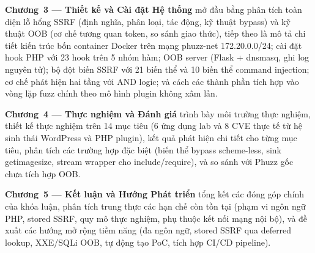 \textbf{Chương~3 --- Thiết kế và Cài đặt Hệ thống} mở đầu bằng phân tích toàn diện
lỗ hổng SSRF (định nghĩa, phân loại, tác động, kỹ thuật bypass) và kỹ thuật OOB
(cơ chế tương quan token, so sánh giao thức), tiếp theo là mô tả chi tiết kiến trúc
bốn container Docker trên mạng phuzz-net 172.20.0.0/24; cài đặt hook PHP với 23 hook
trên 5 nhóm hàm; OOB server (Flask + dnsmasq, ghi log nguyên tử); bộ đột biến SSRF
với 21 biến thể và 10 biến thể command injection; cơ chế phát hiện hai tầng với AND
logic; và cách các thành phần tích hợp vào vòng lặp fuzz chính theo mô hình plugin
không xâm lấn.

\textbf{Chương~4 --- Thực nghiệm và Đánh giá} trình bày môi trường thực nghiệm, thiết
kế thực nghiệm trên 14 mục tiêu (6 ứng dụng lab và 8 CVE thực tế từ hệ sinh thái
WordPress và PHP plugin), kết quả phát hiện chi tiết cho từng mục tiêu, phân tích các
trường hợp đặc biệt (biến thể bypass scheme-less, sink getimagesize, stream wrapper
cho include/require), và so sánh với Phuzz gốc chưa tích hợp OOB.

\textbf{Chương~5 --- Kết luận và Hướng Phát triển} tổng kết các đóng góp chính của
khóa luận, phân tích trung thực các hạn chế còn tồn tại (phạm vi ngôn ngữ PHP, stored
SSRF, quy mô thực nghiệm, phụ thuộc kết nối mạng nội bộ), và đề xuất các hướng mở
rộng tiềm năng (đa ngôn ngữ, stored SSRF qua deferred lookup, XXE/SQLi OOB, tự động
tạo PoC, tích hợp CI/CD pipeline).
